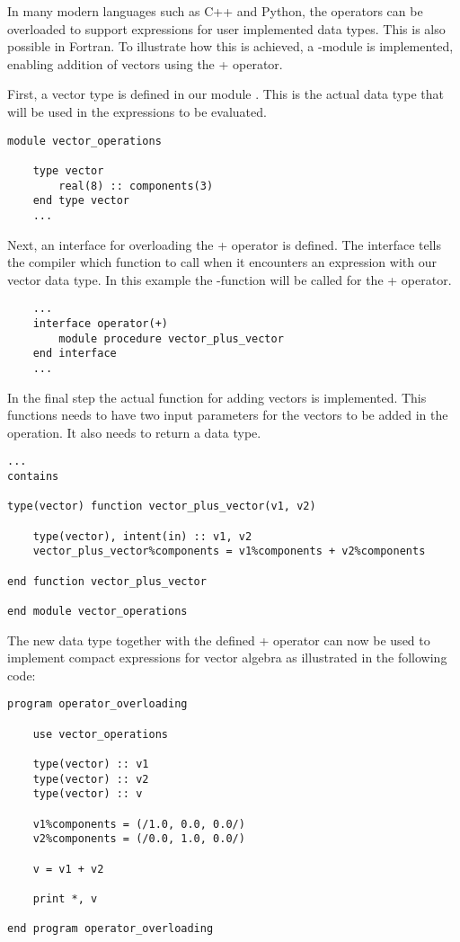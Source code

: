 In many modern languages such as C++ and Python, the operators can be overloaded to support expressions for user implemented data types. This is also possible in Fortran. To illustrate how this is achieved, a -module is implemented, enabling addition of vectors using the + operator. 

First, a vector type is defined in our module . This is the actual data type that will be used in the expressions to be evaluated.

\begin{lstlisting}
module vector_operations

	type vector
		real(8) :: components(3)
	end type vector
	...
\end{lstlisting}

Next, an interface for overloading the + operator is defined. The interface tells the compiler which function to call when it encounters an expression with our vector data type. In this example the -function will be called for the + operator.

\begin{lstlisting}
	...
	interface operator(+)
		module procedure vector_plus_vector
	end interface
	...
\end{lstlisting}

In the final step the actual function for adding vectors is implemented. This functions needs to have two input parameters for the vectors to be added in the operation. It also needs to return a  data type.

\begin{lstlisting}
...
contains

type(vector) function vector_plus_vector(v1, v2)

	type(vector), intent(in) :: v1, v2
	vector_plus_vector%components = v1%components + v2%components
	
end function vector_plus_vector

end module vector_operations
\end{lstlisting}

The new data type together with the defined + operator can now be used to implement compact expressions for vector algebra as illustrated in the following code:

\begin{lstlisting}
program operator_overloading

	use vector_operations

	type(vector) :: v1
	type(vector) :: v2
	type(vector) :: v
	
	v1%components = (/1.0, 0.0, 0.0/)
	v2%components = (/0.0, 1.0, 0.0/)
	
	v = v1 + v2
	
	print *, v

end program operator_overloading
\end{lstlisting}

